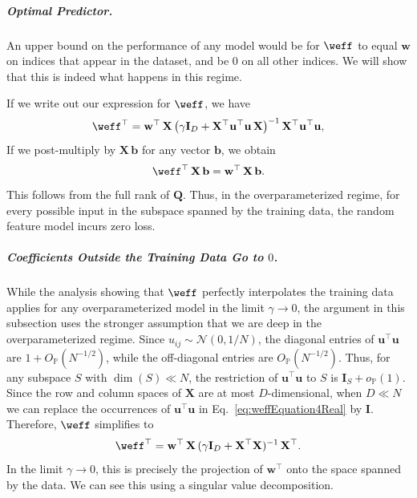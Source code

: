 \documentclass[11pt]{article}
\theoremstyle{plain}
\theoremstyle{definition}
\theoremstyle{remark}
\newcommand{\JSCheck}[1]{#1}
\begin{document}
\subparagraph{\emph{\JSCheck{Optimal Predictor}.}}

An upper bound on the performance of any model would be for $\weff$ to equal $\mathbf{w}$ on indices that appear in the dataset, and be $0$ on all other indices. We will show that this is indeed what happens in this regime.

If we write out our expression for $\weff$, we have
\begin{equation}
    \weff^{\top}=\mathbf{w}^{\top} \,\mathbf{X}\,\bigl(\gamma \mathbf{I}_D+\mathbf{X}^{\top} \mathbf{u}^{\top}\mathbf{u}\,\mathbf{X}\bigr)^{-1}\,\mathbf{X}^{\top} \mathbf{u}^{\top} \mathbf{u},
    \label{eq:weffEquation4Real}
\end{equation}
If we post-multiply by $\mathbf{X}\,\mathbf{b}$ for any vector $\mathbf{b}$, we obtain
\begin{equation*}
    \weff^{\top} \,\mathbf{X}\,\mathbf{b}=\mathbf{w}^{\top}\,\mathbf{X}\,\mathbf{b}.
\end{equation*}
This follows from the full rank of $\mathbf{Q}$. Thus, in the overparameterized regime, for every possible input in the subspace spanned by the training data, the random feature model incurs zero loss.

\subparagraph{\emph{Coefficients Outside the Training Data Go to $0$.}}
\JSCheck{While the analysis showing that \(\weff\) perfectly interpolates the training data applies for any overparameterized model in the limit \(\gamma\to0\), the argument in this subsection uses the stronger assumption that we are deep in the overparameterized regime. Since \(u_{ij}\sim\mathcal{N}(0,1/N)\), the diagonal entries of \(\mathbf{u}^\top\mathbf{u}\) are \(1+O_{\mathbb{P}}(N^{-1/2})\), while the off-diagonal entries are \(O_{\mathbb{P}}(N^{-1/2})\). Thus, for any subspace \(S\) with \(\dim(S)\ll N\), the restriction of \(\mathbf{u}^\top\mathbf{u}\) to \(S\) is \(\mathbf{I}_S+o_{\mathbb{P}}(1)\). Since the row and column spaces of \(\mathbf{X}\) are at most \(D\)-dimensional, when \(D\ll N\) we can replace the occurrences of \(\mathbf{u}^\top\mathbf{u}\) in Eq.~\eqref{eq:weffEquation4Real} by \(\mathbf{I}\). Therefore, \(\weff\) simplifies to}
\begin{equation*}
    \weff^{\top}=\mathbf{w}^{\top} \,\mathbf{X}\,(\gamma \mathbf{I}_D+\mathbf{X}^{\top}\mathbf{X})^{-1}\,\mathbf{X}^{\top}.
    \label{eq:weffEquation-simplified}
\end{equation*}
In the limit $\gamma\to 0$, this is precisely the projection of $\mathbf{w}^{\top}$ onto the space spanned by the data. We can see this using a singular value decomposition.
\end{document}
